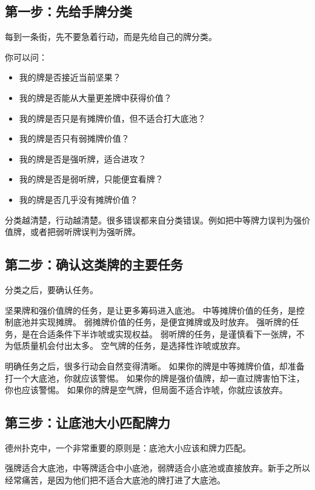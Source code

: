 \subsection{第一步：先给手牌分类}

每到一条街，先不要急着行动，而是先给自己的牌分类。

你可以问：

\begin{itemize}
\item 我的牌是否接近当前坚果？
\item 我的牌是否能从大量更差牌中获得价值？
\item 我的牌是否只是有摊牌价值，但不适合打大底池？
\item 我的牌是否只有弱摊牌价值？
\item 我的牌是否是强听牌，适合进攻？
\item 我的牌是否是弱听牌，只能便宜看牌？
\item 我的牌是否几乎没有摊牌价值？
\end{itemize}

分类越清楚，行动越清楚。很多错误都来自分类错误。例如把中等牌力误判为强价值牌，或者把弱听牌误判为强听牌。

\subsection{第二步：确认这类牌的主要任务}

分类之后，要确认任务。

坚果牌和强价值牌的任务，是让更多筹码进入底池。
中等摊牌价值的任务，是控制底池并实现摊牌。
弱摊牌价值的任务，是便宜摊牌或及时放弃。
强听牌的任务，是在合适条件下半诈唬或实现权益。
弱听牌的任务，是谨慎看下一张牌，不为低质量机会付出太多。
空气牌的任务，是选择性诈唬或放弃。

明确任务之后，很多行动会自然变得清晰。
如果你的牌是中等摊牌价值，却准备打一个大底池，你就应该警惕。
如果你的牌是强价值牌，却一直过牌害怕下注，你也应该警惕。
如果你的牌是空气牌，但局面不适合诈唬，你就应该放弃。

\subsection{第三步：让底池大小匹配牌力}

德州扑克中，一个非常重要的原则是：底池大小应该和牌力匹配。

强牌适合大底池，中等牌适合中小底池，弱牌适合小底池或直接放弃。新手之所以经常痛苦，是因为他们把不适合大底池的牌打进了大底池。


